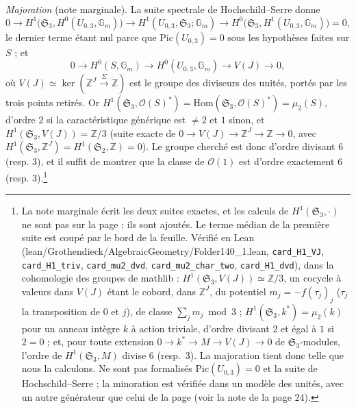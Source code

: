\documentclass[11pt,a4paper]{article}
\begin{document}
\emph{Majoration} (note marginale). La suite spectrale de Hochschild--Serre donne
\[
0 \to H^1\bigl(\mathfrak{S}_3, H^0(U_{0,3}, \mathbb{G}_m)\bigr) \to
H^1(U_{0,3}, \mathfrak{S}_3; \mathbb{G}_m) \to
H^0\bigl(\mathfrak{S}_3, H^1(U_{0,3}, \mathbb{G}_m)\bigr) = 0 ,
\]
le dernier terme étant nul parce que $\mathrm{Pic}(U_{0,3}) = 0$ sous les
hypothèses faites sur $S$ ; et
\[
0 \to H^0(S, \mathbb{G}_m) \to H^0(U_{0,3}, \mathbb{G}_m) \to V(J) \to 0 ,
\]
où $V(J) \simeq \ker(\mathbb{Z}^J \xrightarrow{\Sigma} \mathbb{Z})$ est le groupe
des diviseurs des unités, portés par les trois points retirés. Or
$H^1(\mathfrak{S}_3, \mathcal{O}(S)^{*}) = \mathrm{Hom}(\mathfrak{S}_3,
\mathcal{O}(S)^{*}) = \mu_2(S)$, d'ordre $2$ si la caractéristique générique est
$\neq 2$ et $1$ sinon, et $H^1(\mathfrak{S}_3, V(J)) = \mathbb{Z}/3$ (suite exacte
de $0 \to V(J) \to \mathbb{Z}^J \to \mathbb{Z} \to 0$, avec
$H^1(\mathfrak{S}_3, \mathbb{Z}^J) = H^1(\mathfrak{S}_2, \mathbb{Z}) = 0$). Le groupe
cherché est donc d'ordre divisant $6$ (resp. $3$), et il suffit de montrer que la
classe de $\mathcal{O}(1)$ est d'ordre exactement $6$ (resp. $3$).\footnote{La
note marginale écrit les deux suites exactes, et les calculs de
$H^1(\mathfrak{S}_3, \cdot)$ ne sont pas sur la page ; ils sont ajoutés. Le
terme médian de la première suite est coupé par le bord de la feuille.
Vérifié en Lean (lean/Grothendieck/AlgebraicGeometry/Folder140\_1.lean, \texttt{card\_H1\_VJ},
\texttt{card\_H1\_triv}, \texttt{card\_mu2\_dvd},
\texttt{card\_mu2\_char\_two}, \texttt{card\_H1\_dvd}), dans la cohomologie
des groupes de mathlib : $H^1(\mathfrak{S}_3, V(J)) \simeq \mathbb{Z}/3$, un
cocycle à valeurs dans $V(J)$ étant le cobord, dans $\mathbb{Z}^J$, du
potentiel $m_j = -f(\tau_j)_j$ ($\tau_j$ la transposition de $0$ et $j$), de
classe $\sum_j m_j \bmod 3$ ; $H^1(\mathfrak{S}_3, k^{*}) = \mu_2(k)$ pour un
anneau intègre $k$ à action triviale, d'ordre divisant $2$ et égal à $1$ si
$2 = 0$ ; et, pour toute extension $0 \to k^{*} \to M \to V(J) \to 0$ de
$\mathfrak{S}_3$-modules, l'ordre de $H^1(\mathfrak{S}_3, M)$ divise $6$
(resp.\ $3$). La majoration tient donc telle que nous la calculons. Ne sont pas
formalisés $\mathrm{Pic}(U_{0,3}) = 0$ et la suite de Hochschild--Serre ; la
minoration est vérifiée dans un modèle des unités, avec un autre générateur
que celui de la page (voir la note de la page 24).}
\end{document}
